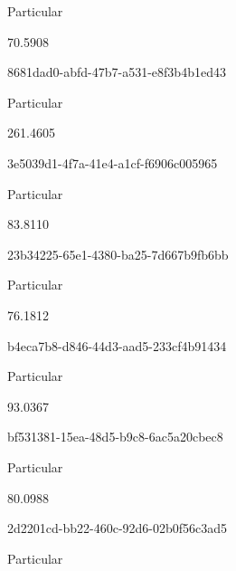 \documentclass[
  11pt,
  a4paper,
  DIV=11,
  numbers=noendperiod]{scrartcl}
\begin{document}
Particular

\n      

70.5908

\n    

\n    

\n      

8681dad0-abfd-47b7-a531-e8f3b4b1ed43

\n      

Particular

\n      

261.4605

\n    

\n    

\n      

3e5039d1-4f7a-41e4-a1cf-f6906c005965

\n      

Particular

\n      

83.8110

\n    

\n    

\n      

23b34225-65e1-4380-ba25-7d667b9fb6bb

\n      

Particular

\n      

76.1812

\n    

\n    

\n      

b4eca7b8-d846-44d3-aad5-233cf4b91434

\n      

Particular

\n      

93.0367

\n    

\n    

\n      

bf531381-15ea-48d5-b9c8-6ac5a20cbec8

\n      

Particular

\n      

80.0988

\n    

\n    

\n      

2d2201cd-bb22-460c-92d6-02b0f56c3ad5

\n      

Particular
\end{document}
